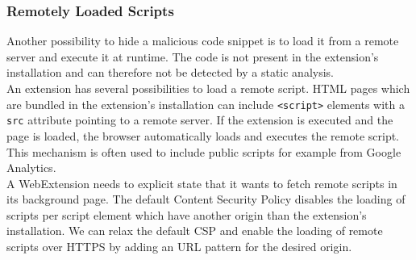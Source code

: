 		
		\subsubsection{Remotely Loaded Scripts}
			
			Another possibility to hide a malicious code snippet is to load it from a remote server and execute it at runtime. The code is not present in the extension's installation and can therefore not be detected by a static analysis. \\
		
			An extension has several possibilities to load a remote script. HTML pages which are bundled in the extension's installation can include \texttt{<script>} elements with a \texttt{src} attribute pointing to a remote server. If the extension is executed and the page is loaded, the browser automatically loads and executes the remote script. This mechanism is often used to include public scripts for example from Google Analytics. \\
			A WebExtension needs to explicit state that it wants to fetch remote scripts in its background page. The default Content Security Policy disables the loading of scripts per script element which have another origin than the extension's installation. We can relax the default CSP and enable the loading of remote scripts over HTTPS by adding an URL pattern for the desired origin. \\

